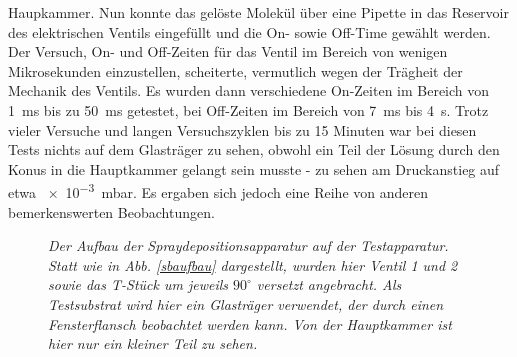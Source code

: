  Haupkammer. Nun konnte das gelöste Molekül über eine Pipette in das Reservoir des elektrischen
 Ventils eingefüllt und die On- sowie Off-Time gewählt werden. Der Versuch, On- und Off-Zeiten für
 das Ventil im Bereich von wenigen Mikrosekunden einzustellen, scheiterte, vermutlich wegen der
 Trägheit der Mechanik des Ventils. Es wurden dann verschiedene On-Zeiten im Bereich von \SI{1}{ms}
 bis zu \SI{50}{ms} getestet, bei Off-Zeiten im Bereich von \SI{7}{ms} bis \SI{4}{s}. Trotz vieler
 Versuche und langen Versuchszyklen bis zu 15 Minuten war bei diesen Tests nichts auf dem
 Glasträger zu sehen, obwohl ein Teil der Lösung durch den Konus in die Hauptkammer gelangt
 sein musste - zu sehen am Druckanstieg auf etwa \SI{e-3}{mbar}. Es ergaben sich jedoch
 eine Reihe von anderen bemerkenswerten Beobachtungen.
 \\

 
\begin{figure}[H]
	\centering
	\sffamily
	
	\caption{\textit{Der Aufbau der Spraydepositionsapparatur auf der Testapparatur. Statt wie in Abb.
	\ref{sbaufbau} dargestellt, wurden hier Ventil 1 und 2 sowie das T-Stück um jeweils $90^{\circ}$
	versetzt angebracht. Als Testsubstrat wird hier ein Glasträger verwendet, der durch einen
	Fensterflansch beobachtet werden kann. Von der Hauptkammer ist hier nur ein kleiner Teil zu
	sehen.}}
\label{aufbau}
\end{figure}
 


